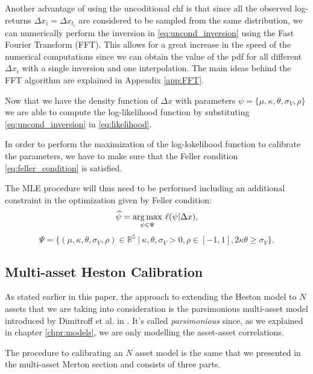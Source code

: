 Another advantage of using the uncoditional \acrfull{chf} is that since all the observed log-returns $\Delta x_i = \Delta x_{t_i} $ are considered to be sampled from the same distribution, we can numerically perform the inversion in \eqref{eq:uncond_inversion} using the Fast Fourier Transform (FFT). This allows for a great increase in the speed of the numerical computations since we can obtain the value of the pdf for all different $\Delta x_i$ with a single inversion and one interpolation.
The main ideas behind the FFT algorithm are explained in Appendix \ref{app:FFT}.


Now that we have the density function of $\Delta x$ with parameters $\psi = \{\mu, \kappa, \theta, \sigma_V, \rho \}$ we are able to compute the log-likelihood function by substituting \eqref{eq:uncond_inversion} in \eqref{eq:likelihood}.


In order to perform the maximization of the log-lokelihood function to calibrate the parameters, we have to make sure that the Feller condition \eqref{eq:feller_condition} is satisfied.

The MLE procedure will thus need to be performed including an additional constraint in the optimization given by Feller condition:
\begin{equation}
\widehat{\psi} = \operatorname*{arg\,max}_{\psi \in \Psi} \:\ell(\psi |  \Delta x),
\end{equation}
\begin{equation}
	\Psi = \{ (\mu, \kappa, \theta, \sigma_V, \rho) \in \mathbb{R}^5 \: |\: \kappa,\theta,\sigma_V >0, \rho \in [-1,1], 2\kappa\theta \geq \sigma_V \}.
\end{equation}



\subsection{Multi-asset Heston Calibration}
\label{sec:multi_heston_cal}
As stated earlier in this paper, the approach to extending the Heston model to $N$ assets that we are taking into consideration is the parsimonious multi-asset model introduced by Dimitroff et al. in \citep{PARSIMONIOUS2011}.
It's called \textit{parsimonious} since, as we explained in chapter \ref{chpr:models}, we are only modelling the asset-asset correlations.

The procedure to calibrating an $N$ asset model is the same that we presented in the multi-asset Merton section and consists of three parts.

